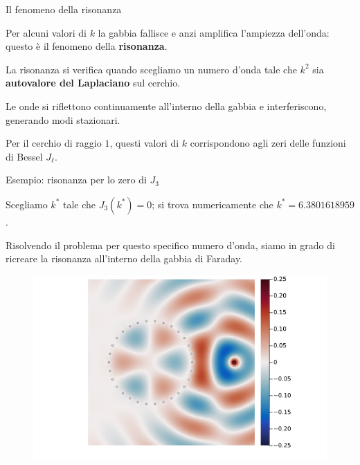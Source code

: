 \documentclass{beamer}
\begin{document}
	\begin{frame}{Il fenomeno della risonanza}
		\begin{block}{}
			Per alcuni valori di $k$ la gabbia fallisce e anzi amplifica l'ampiezza dell'onda: questo è il fenomeno della \textbf{risonanza}.
		\end{block}	
		\vspace*{0.3cm}
		La risonanza si verifica quando scegliamo un numero d'onda tale che $k^2$ sia \textbf{autovalore del Laplaciano} sul cerchio.
		
		Le onde si riflettono continuamente all'interno della gabbia e interferiscono, generando modi stazionari. 
		
		Per il cerchio di raggio $1$, questi valori di $k$ corrispondono agli zeri delle funzioni di Bessel $J_\ell$.
	\end{frame}
	
	\begin{frame}{Esempio: risonanza per lo zero di $J_3$}
		\begin{small}
		\begin{block}{}
			Scegliamo $k^*$ tale che $J_3(k^*)=0$; si trova numericamente che $k^*=6.3801618959$.
			
			Risolvendo il problema per questo specifico numero d'onda, siamo in grado di ricreare la risonanza all'interno della gabbia di Faraday.
		\end{block}
		\begin{figure}
			\includegraphics[width=.48\textwidth]{figs/resonant_plot_5.png}\hfil{}
		\end{figure}	
		\end{small}
	\end{frame}
	
\end{document}
